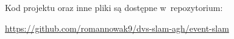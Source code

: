 \documentclass[11pt]{aghdpl}
\author{Roman Nowak}
\date{2026}
\begin{document}
    \titlepages
    {
    	\fancyhf{}
    	\renewcommand{\headrulewidth}{0pt}
    	\renewcommand{\footrulewidth}{0pt}
    }

    
    \setcounter{tocdepth}{2}
    \tableofcontents
    \clearpage
    
    
    
    
    
    
    
    
    
    
    \printbibliography

    Kod projektu oraz inne pliki są dostępne w~repozytorium: 
    
    \url{https://github.com/romannowak9/dvs-slam-agh/event-slam}
\end{document}
